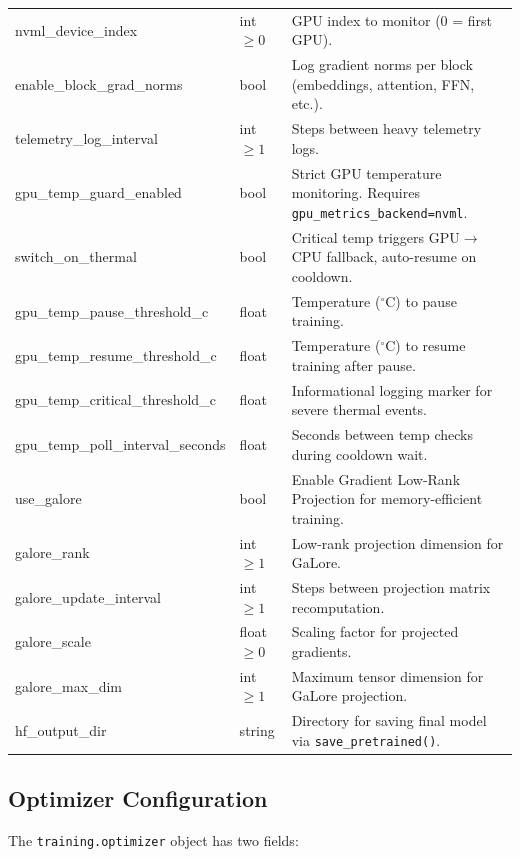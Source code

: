 \begin{longtable}{>{\ttfamily}l>{\raggedright\arraybackslash}p{3.5cm}>{\raggedright\arraybackslash}p{8.5cm}}
nvml\_device\_index & int $\ge 0$ & GPU index to monitor (0 = first GPU). \\
enable\_block\_grad\_norms & bool & Log gradient norms per block (embeddings, attention, FFN, etc.). \\
telemetry\_log\_interval & int $\ge 1$ & Steps between heavy telemetry logs. \\
gpu\_temp\_guard\_enabled & bool & Strict GPU temperature monitoring. Requires \texttt{gpu\_metrics\_backend=nvml}. \\
switch\_on\_thermal & bool & Critical temp triggers GPU$\to$CPU fallback, auto-resume on cooldown. \\
gpu\_temp\_pause\_threshold\_c & float & Temperature ($^\circ$C) to pause training. \\
gpu\_temp\_resume\_threshold\_c & float & Temperature ($^\circ$C) to resume training after pause. \\
gpu\_temp\_critical\_threshold\_c & float & Informational logging marker for severe thermal events. \\
gpu\_temp\_poll\_interval\_seconds & float & Seconds between temp checks during cooldown wait. \\
use\_galore & bool & Enable Gradient Low-Rank Projection for memory-efficient training. \\
galore\_rank & int $\ge 1$ & Low-rank projection dimension for GaLore. \\
galore\_update\_interval & int $\ge 1$ & Steps between projection matrix recomputation. \\
galore\_scale & float $\ge 0$ & Scaling factor for projected gradients. \\
galore\_max\_dim & int $\ge 1$ & Maximum tensor dimension for GaLore projection. \\
hf\_output\_dir & string & Directory for saving final model via \texttt{save\_pretrained()}. \\
\end{longtable}

\subsection{Optimizer Configuration}
\label{subsec:optimizer-config}

The \texttt{training.optimizer} object has two fields:

